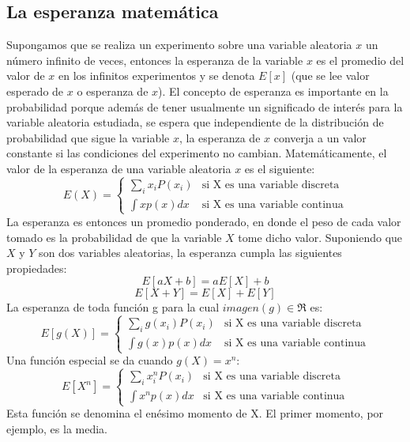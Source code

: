 \documentclass[a4paper, 11pt, oneside]{report}
\begin{document}
\subsection{La esperanza matemática}
Supongamos que se realiza un experimento sobre una variable aleatoria $x$ un número infinito de veces, entonces la esperanza de la variable $x$ es el promedio del valor de $x$ en los infinitos experimentos y se denota $E[x]$ (que se lee valor esperado de $x$ o esperanza de $x$). El concepto de esperanza es importante en la probabilidad porque además de tener usualmente un significado de interés para la variable aleatoria estudiada, se espera que independiente de la distribución de probabilidad que sigue la variable $x$, la esperanza de $x$ converja a un valor constante si las condiciones del experimento no cambian. Matemáticamente, el valor de la esperanza de una variable aleatoria $x$ es el siguiente:
\[ E(X) = \left\{ \begin{array}{ll}
\sum_{i}{x_iP(x_i)} & \mbox{si X es una variable discreta} \\
\int {xp(x)dx} & \mbox{si X es una variable continua}
\end{array} \right. \]
La esperanza es entonces un promedio ponderado, en donde el peso de cada valor tomado es la probabilidad de que la variable $X$ tome dicho valor. Suponiendo que $X$ y $Y$ son dos variables aleatorias, la esperanza cumpla las siguientes propiedades:
\[E[aX + b] = aE[X] + b\]
\[E[X + Y] = E[X] + E[Y]\]
La esperanza de toda función g para la cual $imagen(g) \in \Re$ es:
\[ E[g(X)] = \left\{ \begin{array}{ll}
\sum_{i}{g(x_i)P(x_i)} & \mbox{si X es una variable discreta} \\
\int {g(x)p(x)dx} & \mbox{si X es una variable continua}
\end{array} \right. \]
Una función especial se da cuando $g(X) = x^n$:
\[ E[X^n] = \left\{ \begin{array}{ll}
\sum_{i}{x_i^nP(x_i)} & \mbox{si X es una variable discreta} \\
\int {x^np(x)dx} & \mbox{si X es una variable continua}
\end{array} \right. \]
Esta función se denomina el enésimo momento de X. El primer momento, por ejemplo, es la media.
\end{document}
